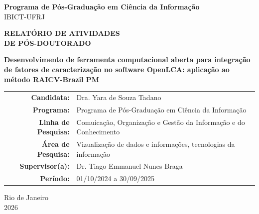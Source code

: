 
\thispagestyle{empty}

\begin{center}

\vspace*{1cm}

{\Large\bfseries Programa de Pós-Graduação em Ciência da Informação}\\[0.3cm]
{\large IBICT-UFRJ}

\vspace{2cm}

{\LARGE\bfseries RELAT\'ORIO DE ATIVIDADES\\[0.3cm] DE P\'OS-DOUTORADO}

\vspace{2cm}

{\Large\bfseries Desenvolvimento de ferramenta computacional aberta para integra\c{c}\~ao de fatores de caracteriza\c{c}\~ao no software OpenLCA: aplica\c{c}\~ao ao m\'etodo RAICV-Brazil PM}

\vspace{2.5cm}

\begin{tabular}{rl}
\textbf{Candidata:} & Dra. Yara de Souza Tadano \\[0.3cm]
\textbf{Programa:} & {Programa de P\'os-Gradua\c{c}\~ao em Ciência da Informação} \\[0.3cm]
\textbf{Linha de Pesquisa:} & Comuicação, Organização e Gestão da Informação e do Conhecimento \\[0.3cm]
\textbf{\'Area de Pesquisa:} & Vizualização de dados e informações, tecnologias da informação \\[0.3cm]
\textbf{Supervisor(a):} & {Dr. Tiago Emmanuel Nunes Braga} \\[0.3cm]
\textbf{Per\'iodo:} & {01/10/2024} a {30/09/2025} \\
\end{tabular}

\vfill

{\large Rio de Janeiro\\[0.2cm] 2026}

\end{center}
